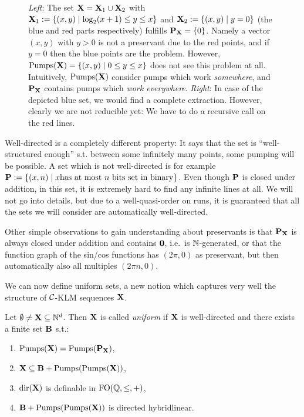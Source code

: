 \begin{figure}[h!]
\caption{\textit{Left}: The set \(\mathbf{X}=\mathbf{X}_1 \cup \mathbf{X}_2\) with \(\mathbf{X}_1:=\{(x,y) \mid \log_2(x+1) \leq y \leq x\}\) and \(\mathbf{X}_2:=\{(x,y) \mid y=0\}\) (the blue and red parts respectively) fulfills \(\operatorname{\mathbf{P}_{\mathbf{X}}}=\{0\}\). Namely a vector \((x,y)\) with \(y>0\) is not a preservant due to the red points, and if \(y=0\) then the blue points are the problem. However, \(\operatorname{Pumps}(\mathbf{X})=\{(x,y) \mid 0 \leq y \leq x\}\) does not see this problem at all. Intuitively, \(\operatorname{Pumps}(\mathbf{X})\) consider pumps which work \emph{somewhere}, and \(\operatorname{\mathbf{P}_{\mathbf{X}}}\) contains pumps which \emph{work everywhere}. \newline
\textit{Right}: In case of the depicted blue set, we would find a complete extraction. However, clearly we are not reducible yet: We have to do a recursive call on the red lines.}\label{FigureIntuitionPreservants}
\end{figure}

Well-directed is a completely different property: It says that the set is ``well-structured enough'' s.t. between some infinitely many points, some pumping will be possible. A set which is not well-directed is for example \(\mathbf{P}:=\{(x,n) \mid x \text{has at most }n\text{ bits set in binary}\}\). Even though \(\mathbf{P}\) is closed under addition, in this set, it is extremely hard to find any infinite lines at all. We will not go into details, but due to a well-quasi-order on runs, it is guaranteed that all the sets we will consider are automatically well-directed.

Other simple observations to gain understanding about preservants is that \(\operatorname{\mathbf{P}_{\mathbf{X}}}\) is always closed under addition and contains \(\mathbf{0}\), i.e.\ is \(\mathbb{N}\)-generated, or that the function graph of the sin/cos functions has \((2\pi,0)\) as preservant, but then automatically also all multiples \((2\pi n, 0)\).

We can now define uniform sets, a new notion which captures very well the structure of \(\mathcal{C}\)-KLM sequences \(\mathbf{X}\).

\begin{definition} \label{DefinitionUniform}
Let \(\emptyset \neq \mathbf{X} \subseteq \mathbb{N}^d\). Then \(\mathbf{X}\) is called \emph{uniform} if \(\mathbf{X}\) is well-directed and there exists a finite set \(\mathbf{B}\) s.t.:

\begin{enumerate}
\item \(\operatorname{Pumps}(\mathbf{X})=\operatorname{Pumps}(\operatorname{\mathbf{P}_{\mathbf{X}}})\),
\item \(\mathbf{X} \subseteq \mathbf{B}+\operatorname{Pumps}(\operatorname{Pumps}(\mathbf{X}))\),
\item \(\operatorname{dir}(\mathbf{X})\) is definable in \(\operatorname{FO}(\mathbb{Q}, \leq, +)\),
\item \(\mathbf{B}+\operatorname{Pumps}(\operatorname{Pumps}(\mathbf{X}))\) is directed hybridlinear.
\end{enumerate}
\end{definition}

